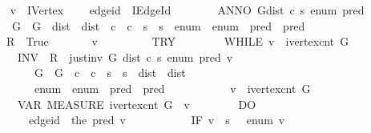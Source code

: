 \begin{isabellebody}
\ \ \isanewline
\ \ \ \ v\ {\isacharcolon}{\isacharcolon}\ IVertex\isanewline
\ \ \ \ edge{\isacharunderscore}id\ {\isacharcolon}{\isacharcolon}\ IEdge{\isacharunderscore}Id\isanewline
\ \ \ {\isachardoublequoteopen}\isanewline
\ \ \ \ ANNO\ {\isacharparenleft}G{\isacharcomma}dist{\isacharcomma}\ c{\isacharcomma}\ s\ {\isacharcomma}enum{\isacharcomma}\ pred{\isacharparenright}{\isachardot}\isanewline
\ \ \ \ \ \ {\isasymlbrace}\ {\isasymacute}G\ {\isacharequal}\ G\ {\isasymand}\ {\isasymacute}dist\ {\isacharequal}\ dist\ {\isasymand}\ {\isasymacute}c\ {\isacharequal}\ c\ {\isasymand}\ {\isasymacute}s\ {\isacharequal}\ s\ {\isasymand}\ {\isasymacute}enum\ {\isacharequal}\ enum\ {\isasymand}\ {\isasymacute}pred\ {\isacharequal}\ pred{\isasymrbrace}\isanewline
\ \ \ \ \ \ {\isasymacute}R\ {\isacharcolon}{\isacharequal}{\isacharequal}\ True\ {\isacharsemicolon}{\isacharsemicolon}\isanewline
\ \ \ \ \ \ {\isasymacute}v\ {\isacharcolon}{\isacharequal}{\isacharequal}\ {}\ {\isacharsemicolon}{\isacharsemicolon}\isanewline
\ \ \ \ \ \ TRY\isanewline
\ \ \ \ \ \ \ \ WHILE\ {\isasymacute}v\ {\isacharless}\ ivertex{\isacharunderscore}cnt\ {\isasymacute}G\isanewline
\ \ \ \ \ \ \ \ INV\ {\isasymlbrace}\ {\isasymacute}R\ {\isacharequal}\ just{\isacharunderscore}inv\ {\isasymacute}G\ {\isasymacute}dist\ {\isasymacute}c\ {\isasymacute}s\ {\isasymacute}enum\ {\isasymacute}pred\ {\isasymacute}v\isanewline
\ \ \ \ \ \ \ \ \ \ {\isasymand}\ {\isasymacute}G\ {\isacharequal}\ G\ {\isasymand}\ {\isasymacute}c\ {\isacharequal}\ c\ {\isasymand}\ {\isasymacute}s\ {\isacharequal}\ s\ {\isasymand}\ {\isasymacute}dist\ {\isacharequal}\ dist\ \isanewline
\ \ \ \ \ \ \ \ \ \ {\isasymand}\ {\isasymacute}enum\ {\isacharequal}\ enum\ {\isasymand}\ {\isasymacute}pred\ {\isacharequal}\ pred\isanewline
\ \ \ \ \ \ \ \ \ \ {\isasymand}\ {\isasymacute}v\ {\isasymle}\ ivertex{\isacharunderscore}cnt\ {\isasymacute}G{\isasymrbrace}\isanewline
\ \ \ \ \ \ \ \ VAR\ MEASURE\ {\isacharparenleft}ivertex{\isacharunderscore}cnt\ {\isasymacute}G\ {\isacharminus}\ {\isasymacute}v{\isacharparenright}\isanewline
\ \ \ \ \ \ \ \ DO\isanewline
\ \ \ \ \ \ \ \ \ \ {\isasymacute}edge{\isacharunderscore}id\ {\isacharcolon}{\isacharequal}{\isacharequal}\ the\ {\isacharparenleft}{\isasymacute}pred\ {\isasymacute}v{\isacharparenright}\ {\isacharsemicolon}{\isacharsemicolon}\isanewline
\ \ \ \ \ \ \ \ \ \ IF\ {\isacharparenleft}{\isasymacute}v\ {\isasymnoteq}\ {\isasymacute}s{\isacharparenright}\ {\isasymand}\ \ {\isasymacute}enum\ {\isasymacute}v\ {\isasymnoteq}\ {\isasyminfinity}\ {\isasymand}\isanewline

\end{isabellebody}
